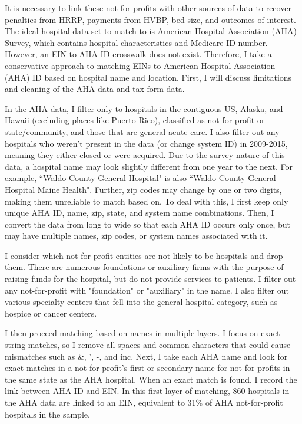 \documentclass[12pt]{article}
\begin{document}
It is necessary to link these not-for-profits with other sources of data to recover penalties from HRRP, payments from HVBP, bed size, and outcomes of interest. The ideal hospital data set to match to is American Hospital Association (AHA) Survey, which contains hospital characteristics and Medicare ID number. However, an EIN to AHA ID crosswalk does not exist. Therefore, I take a conservative approach to matching EINs to American Hospital Association (AHA) ID based on hospital name and location. First, I will discuss limitations and cleaning of the AHA data and tax form data. 

In the AHA data, I filter only to hospitals in the contiguous US, Alaska, and Hawaii (excluding places like Puerto Rico), classified as not-for-profit or state/community, and those that are general acute care. I also filter out any hospitals who weren't present in the data (or change system ID) in 2009-2015, meaning they either closed or were acquired. Due to the survey nature of this data, a hospital name may look slightly different from one year to the next. For example, ``Waldo County General Hospital" is also ``Waldo County General Hospital Maine Health". Further, zip codes may change by one or two digits, making them unreliable to match based on. To deal with this, I first keep only unique AHA ID, name, zip, state, and system name combinations. Then, I convert the data from long to wide so that each AHA ID occurs only once, but may have multiple names, zip codes, or system names associated with it.

I consider which not-for-profit entities are not likely to be hospitals and drop them. There are numerous foundations or auxiliary firms with the purpose of raising funds for the hospital, but do not provide services to patients. I filter out any not-for-profit with "foundation" or "auxiliary" in the name. I also filter out various specialty centers that fell into the general hospital category, such as hospice or cancer centers. 

I then proceed matching based on names in multiple layers. I focus on exact string matches, so I remove all spaces and common characters that could cause mismatches such as \&, ', -, and inc. Next, I take each AHA name and look for exact matches in a not-for-profit's first or secondary name for not-for-profits in the same state as the AHA hospital. When an exact match is found, I record the link between AHA ID and EIN. In this first layer of matching, 860 hospitals in the AHA data are linked to an EIN, equivalent to 31\% of AHA not-for-profit hospitals in the sample. 
\end{document}
